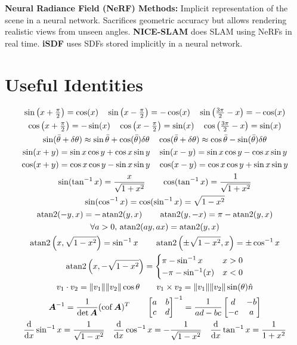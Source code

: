 \documentclass[twocolumn, 8pt]{extarticle}
\begin{document}
\textbf{Neural Radiance Field (NeRF) Methods:} Implicit representation of the scene in a neural network. Sacrifices
geometric accuracy but allows rendering realistic views from unseen angles. \textbf{NICE-SLAM} does SLAM using NeRFs in
real time. \textbf{iSDF} uses SDFs stored implicitly in a neural network.

\section{Useful Identities} %

\begin{gather*}
  {\textstyle\sin\left(x + \frac{\pi}{2}\right) = \cos(x) \quad \sin\left(x - \frac{\pi}{2}\right) = -\cos(x) \quad \sin\left(\frac{3\pi}{2} - x\right) = -\cos(x)} \\
  {\textstyle\cos\left(x + \frac{\pi}{2}\right) = -\sin(x) \quad \cos\left(x - \frac{\pi}{2}\right) = \sin(x) \quad \cos\left(\frac{3\pi}{2} - x\right) = \sin(x)} \\
  \sin(\bar\theta + \delta\theta) \approx \sin\bar\theta + \cos(\bar\theta)\delta\theta \quad
  \cos(\bar\theta + \delta\theta) \approx \cos\bar\theta - \sin(\bar\theta)\delta\theta \\
  \sin(x + y) = \sin x\cos y + \cos x\sin y \quad \sin(x - y) = \sin x\cos y - \cos x\sin y \\
  \cos(x + y) = \cos x\cos y - \sin x\sin y \quad \cos(x - y) = \cos x\cos y + \sin x\sin y \\
  \sin(\tan^{-1} x) = \frac{x}{\sqrt{1 + x^2}} \qquad \cos(\tan^{-1} x) = \frac{1}{\sqrt{1 + x^2}} \\
  \sin(\cos^{-1} x) = \cos(\sin^{-1} x) = \sqrt{1 - x^2} \\
  \operatorname{atan2}(-y, x) = -\operatorname{atan2}(y, x) \qquad \operatorname{atan2}(y, -x) = \pi - \operatorname{atan2}(y, x) \\
  \forall a > 0,\,\operatorname{atan2}(ay, ax) = \operatorname{atan2}(y, x) \\
  \operatorname{atan2}\left(x, \sqrt{1 - x^2}\right) = \sin^{-1} x \qquad \operatorname{atan2}\left(\pm\sqrt{1 - x^2}, x\right) = \pm\cos^{-1} x \\
  \operatorname{atan2}\left(x, -\sqrt{1 - x^2}\right) = \begin{cases} {\pi - \sin^{-1}x} & {x > 0} \\ {-\pi - \sin^{-1}(x)} & {x < 0} \end{cases} \\
  v_1 \cdot v_2 = \lVert v_1\rVert\lVert v_2\rVert\cos\theta \qquad v_1 \times v_2 = \lVert v_1\rVert\lVert v_2\rVert\sin(\theta)\hat n \\
  \bm A^{-1} = \frac{1}{\det\bm A}(\operatorname{cof}\bm A)^T \qquad \begin{bmatrix} {a} & {b} \\ {c} & {d} \end{bmatrix}^{-1} = \frac{1}{ad - bc}\begin{bmatrix} {d} & {-b} \\ {-c} & {a} \end{bmatrix} \\
  \frac{\mathrm{d}}{\mathrm{d}x}\sin^{-1}x = \frac{1}{\sqrt{1 - x^2}} \quad \frac{\mathrm{d}}{\mathrm{d}x}\cos^{-1}x = -\frac{1}{\sqrt{1 - x^2}} \quad \frac{\mathrm{d}}{\mathrm{d}x}\tan^{-1}x = \frac{1}{1 + x^2} \\
\end{gather*}
\end{document}
